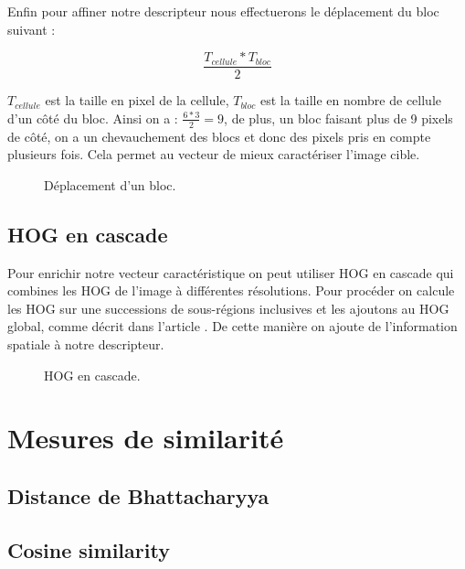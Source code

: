 
Enfin pour affiner notre descripteur nous effectuerons le déplacement du bloc suivant :

\[ \frac{T_{cellule} * T_{bloc}}{2} \]

$T_{cellule}$ est la taille en pixel de la cellule,
$T_{bloc}$ est la taille en nombre de cellule d'un côté du bloc.
Ainsi on a : $\frac{6*3}{2} = 9$, de plus, un bloc faisant plus de 9 pixels de côté, on a un chevauchement des blocs et donc des pixels pris en compte plusieurs fois. Cela permet au vecteur de mieux caractériser l'image cible.

\begin{figure}[!htbp]
\center
\caption{Déplacement d'un bloc.}
\label{fig:blocOverlap}
\end{figure}

\subsection{HOG en cascade}

Pour enrichir notre vecteur caractéristique on peut utiliser HOG en cascade qui combines les HOG de l'image à différentes résolutions. Pour procéder on calcule les HOG sur une successions de sous-régions inclusives et les ajoutons au HOG global, comme décrit dans l'article \cite{qiang_zhu_fast_2006}. De cette manière on ajoute de l'information spatiale à notre descripteur.

\begin{figure}[!htbp]
\center
\caption{HOG en cascade.}
\label{fig:cuttlefish_hog}
\end{figure}




\section{Mesures de similarité}


\subsection{Distance de Bhattacharyya}


\subsection{Cosine similarity}




